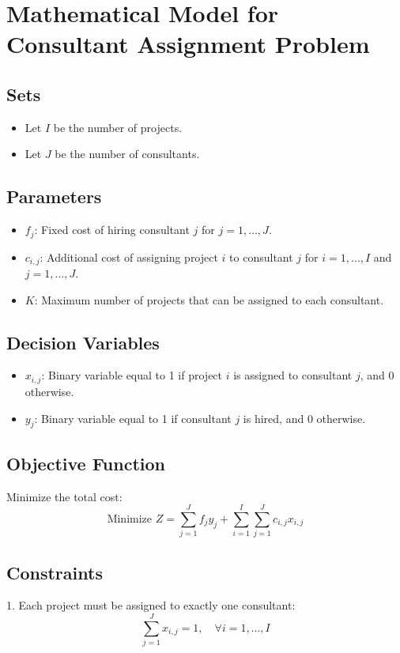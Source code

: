 \documentclass{article}
\begin{document}
\section*{Mathematical Model for Consultant Assignment Problem}

\subsection*{Sets}
\begin{itemize}
    \item Let \( I \) be the number of projects.
    \item Let \( J \) be the number of consultants.
\end{itemize}

\subsection*{Parameters}
\begin{itemize}
    \item \( f_j \): Fixed cost of hiring consultant \( j \) for \( j = 1, \ldots, J \).
    \item \( c_{i,j} \): Additional cost of assigning project \( i \) to consultant \( j \) for \( i = 1, \ldots, I \) and \( j = 1, \ldots, J \).
    \item \( K \): Maximum number of projects that can be assigned to each consultant.
\end{itemize}

\subsection*{Decision Variables}
\begin{itemize}
    \item \( x_{i,j} \): Binary variable equal to 1 if project \( i \) is assigned to consultant \( j \), and 0 otherwise.
    \item \( y_j \): Binary variable equal to 1 if consultant \( j \) is hired, and 0 otherwise.
\end{itemize}

\subsection*{Objective Function}
Minimize the total cost:
\[
\text{Minimize } Z = \sum_{j=1}^{J} f_j y_j + \sum_{i=1}^{I} \sum_{j=1}^{J} c_{i,j} x_{i,j}
\]

\subsection*{Constraints}
1. Each project must be assigned to exactly one consultant:
\[
\sum_{j=1}^{J} x_{i,j} = 1, \quad \forall i = 1, \ldots, I
\]
\end{document}
